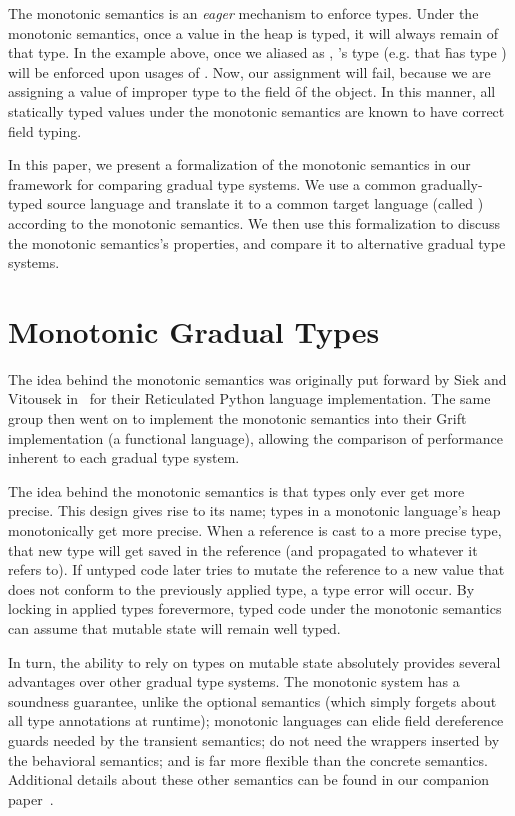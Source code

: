 \documentclass[sigconf]{acmart}
\begin{document}
The monotonic semantics is an \emph{eager} mechanism to enforce types. Under
the monotonic semantics, once a value in the heap is typed, it will always
remain of that type. In the example above, once we aliased \x as \xp, \xp's
type (e.g. that \f has type ) will be enforced upon usages of
\x. Now, our assignment  will fail, because we are
assigning a value of improper type to the field \f of the object. In this
manner, all statically typed values under the monotonic semantics are known
to have correct field typing.

In this paper, we present a formalization of the monotonic semantics in our
framework for comparing gradual type systems. We use a common
gradually-typed source language and translate it to a common target language
(called \kafka) according to the monotonic semantics. We then use this
formalization to discuss the monotonic semantics's properties, and compare
it to alternative gradual type systems.

\section{Monotonic Gradual Types}

The idea behind the monotonic semantics was originally put forward by Siek
and Vitousek in~\cite{seik14} for their Reticulated Python language
implementation. The same group then went on to implement the monotonic
semantics into their Grift implementation (a functional language), allowing
the comparison of performance inherent to each gradual type system.

The idea behind the monotonic semantics is that types only ever get more
precise. This design gives rise to its name; types in a monotonic language's
heap monotonically get more precise. When a reference is cast to a more
precise type, that new type will get saved in the reference (and propagated to
whatever it refers to). If untyped code later tries to mutate the reference to
a new value that does not conform to the previously applied type, a type error
will occur. By locking in applied types forevermore, typed code under the
monotonic semantics can assume that mutable state will remain well typed.

In turn, the ability to rely on types on mutable state absolutely provides
several advantages over other gradual type systems. The monotonic system has
a soundness guarantee, unlike the optional semantics (which simply forgets
about all type annotations at runtime); monotonic languages can elide field
dereference guards needed by the transient semantics; do not need the
wrappers inserted by the behavioral semantics; and is far more flexible than
the concrete semantics. Additional details about these other semantics can
be found in our companion paper~\cite{us}.
\end{document}
